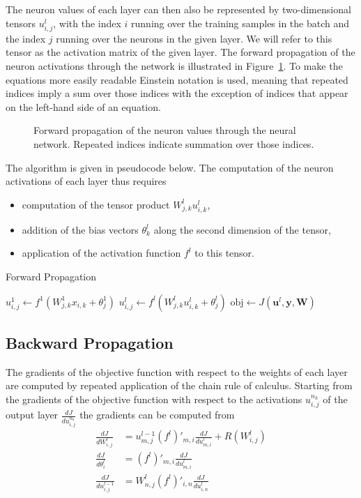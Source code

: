 \documentclass[a4paper,11pt,bibtotoc,xcolor=dvipsnames]{scrartcl}
\begin{document}
The neuron values of each layer can then also be represented by
two-dimensional tensors $u^l_{i,j}$, with the index $i$ running over
the training samples in the batch and the index $j$ running over the
neurons in the given layer. We will refer to this tensor as the activation
matrix of the given layer. The forward propagation of the neuron activations through
the network is illustrated in Figure~\ref{fig:forward}. To make the equations more
easily readable Einstein notation is used, meaning that repeated indices
imply a sum over those indices with the exception of indices that appear on the
left-hand side of an equation.

\begin{figure}[!h]
\centering
\resizebox{\linewidth}{!}{%
}
\caption{Forward propagation of the neuron values through the neural network.
  Repeated indices indicate summation over those indices.}
\label{fig:forward}
\end{figure}

The algorithm is given in pseudocode below. The computation of the neuron
 activations of each layer thus requires
\begin{itemize}
  \item computation of the tensor product $W^l_{j,k}u^l_{i,k}$,
  \item addition of the bias vectors $\theta^l_k$ along the second dimension
    of the tensor,
  \item application of the activation function $f^l$ to this tensor.
\end{itemize}


\begin{algorithm}
  \caption{Forward Propagation} \label{alg:gn}
\begin{algorithmic}[1]
  \State $u^1_{i,j} \leftarrow f^1 \left (W^1_{j,k}x_{i,k} + \theta^1_j \right )$
  \State $u^l_{i,j} \leftarrow f^l \left (W^l_{j,k}u^l_{i,k} + \theta^l_j \right )$
  \EndFor
  \State $\text{obj} \leftarrow J \left (\mathbf{u}^l, \mathbf{y}, \mathbf{W} \right)$
\end{algorithmic}
\end{algorithm}

\subsection{Backward Propagation}

The gradients of the objective function with respect to the weights of each layer
are computed by repeated application of the chain rule of calculus. Starting from
the gradients of the objective function with respect to the activations $u^{n_h}_{i,j}$
 of the output layer $\frac{dJ}{du^{n_h}_{i,j}}$ the gradients can be computed from
\begin{align}
  \frac{dJ}{dW^l_{i,j}}      &= u^{l-1}_{m,j} (f^l)'_{m,i} \frac{dJ}{du^l_{m,i}} + R(W^l_{i,j}) \label{eq:bp1} \\
  \frac{dJ}{d\theta^l_{i}} &= (f^l)'_{m,i} \frac{dJ}{du^l_{m,i}} \\
  \frac{dJ}{du^{l-1}_{i,j}}  &= W^l_{n,j}(f^l)'_{i,n} \frac{dJ}{du^l_{i,n}} \label{eq:bp2}
\end{align}
\end{document}
